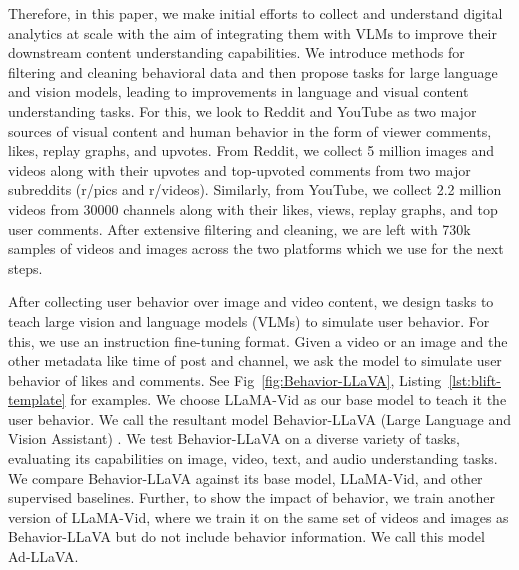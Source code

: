 Therefore, in this paper, we make initial efforts to collect and understand digital analytics at scale with the aim of integrating them with VLMs to improve their downstream content understanding capabilities. We introduce methods for filtering and cleaning behavioral data and then propose tasks for large language and vision models, leading to improvements in language and visual content understanding tasks. For this, we look to Reddit and YouTube as two major sources of visual content and human behavior in the form of viewer comments, likes, replay graphs, and upvotes. From Reddit, we collect 5 million images and videos along with their upvotes and top-upvoted comments from two major subreddits (r/pics and r/videos). Similarly, from YouTube, we collect 2.2 million videos from 30000 channels along with their likes, views, replay graphs, and top user comments. After extensive filtering and cleaning, we are left with 730k samples of videos and images across the two platforms which we use for the next steps. 





After collecting user behavior over image and video content, we design tasks to teach large vision and language models (VLMs) to simulate user behavior. For this, we use an instruction fine-tuning format. Given a video or an image and the other metadata like time of post and channel, we ask the model to simulate user behavior of likes and comments. See Fig~\ref{fig:Behavior-LLaVA}, Listing~\ref{lst:blift-template} for examples. We choose LLaMA-Vid \cite{li2023llamavid} as our base model to teach it the user behavior. We call the resultant model Behavior-LLaVA (Large Language and Vision Assistant) \cite{liu2023visual}. We test Behavior-LLaVA on a diverse variety of tasks, evaluating its capabilities on image, video, text, and audio understanding tasks. We compare Behavior-LLaVA against its base model, LLaMA-Vid, and other supervised baselines. Further, to show the impact of behavior, we train another version of LLaMA-Vid, where we train it on the same set of videos and images as Behavior-LLaVA but do not include behavior information. We call this model Ad-LLaVA.


